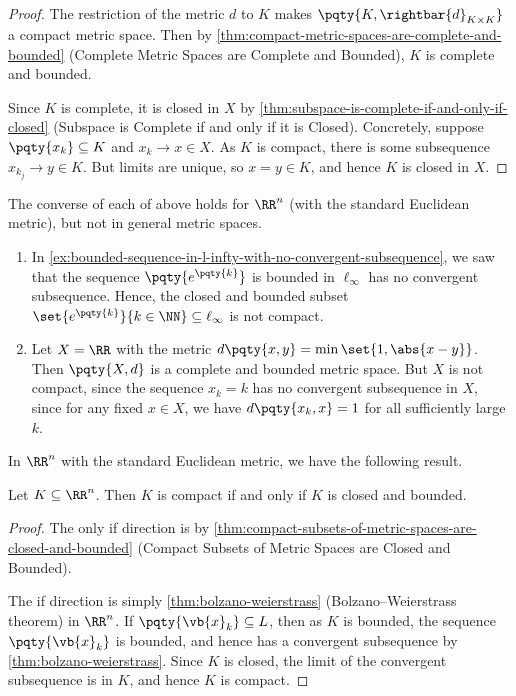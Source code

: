 \begin{proof}
    The restriction of the metric \(d\) to \(K\) makes \(\pqty{K, \rightbar{d}_{K \times K}}\) a compact metric space. Then by \autoref{thm:compact-metric-spaces-are-complete-and-bounded} (Complete Metric Spaces are Complete and Bounded), \(K\) is complete and bounded.
    
    Since \(K\) is complete, it is closed in \(X\) by \autoref{thm:subspace-is-complete-if-and-only-if-closed} (Subspace is Complete if and only if it is Closed). Concretely, suppose \(\pqty{x_k} \subseteq K\) and \(x_k \to x \in X\). As \(K\) is compact, there is some subsequence \(x_{k_j} \to y \in K\). But limits are unique, so \(x = y \in K\), and hence \(K\) is closed in \(X\).
\end{proof}

The converse of each of above holds for \(\RR^n\) (with the standard Euclidean metric), but not in general metric spaces.

\begin{examples}
    \begin{enumerate}
        \item In \autoref{ex:bounded-sequence-in-l-infty-with-no-convergent-subsequence}, we saw that the sequence \(\pqty{e^{\pqty{k}}}\) is bounded in \(\ell_{\infty}\) has no convergent subsequence. Hence, the closed and bounded subset \(\set{e^{\pqty{k}}}{k \in \NN} \subseteq \ell_{\infty}\) is not compact.
        \item Let \(X = \RR\) with the metric \(d\pqty{x, y} = \min\set{1, \abs{x - y}}\). Then \(\pqty{X, d}\) is a complete and bounded metric space. But \(X\) is not compact, since the sequence \(x_k = k\) has no convergent subsequence in \(X\), since for any fixed \(x \in X\), we have \(d\pqty{x_k, x} = 1\) for all sufficiently large \(k\).
    \end{enumerate}
\end{examples}

In \(\RR^n\) with the standard Euclidean metric, we have the following result.

\begin{theorem}
    \label{thm:heine-borel}%
    Let \(K \subseteq \RR^n\). Then \(K\) is compact if and only if \(K\) is closed and bounded.
\end{theorem}

\begin{proof}
    The only if direction is by \autoref{thm:compact-subsets-of-metric-spaces-are-closed-and-bounded} (Compact Subsets of Metric Spaces are Closed and Bounded).

    The if direction is simply \autoref{thm:bolzano-weierstrass} (Bolzano--Weierstrass theorem) in \(\RR^n\). If \(\pqty{\vb{x}_k} \subseteq L\), then as \(K\) is bounded, the sequence \(\pqty{\vb{x}_k}\) is bounded, and hence has a convergent subsequence by \autoref{thm:bolzano-weierstrass}. Since \(K\) is closed, the limit of the convergent subsequence is in \(K\), and hence \(K\) is compact.
\end{proof}

